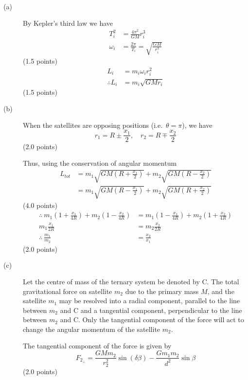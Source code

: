 \begin{description}
\item[(a)] By Kepler's third law we have
  \begin{align*}
    T_i^2 &= \frac{4\pi^2}{GM}r_i^3 \\
    \omega_i &= \frac{2\pi}{T_i} = \sqrt{\frac{GM}{r_i^3}}
  \end{align*}
  \hfill(1.5 points)
  \begin{align*}
    L_i &= m_i\omega_i r_i^2 \\
    \therefore L_i &= m_i\sqrt{GMr_i}
  \end{align*}
  \hfill(1.5 points)

\item[(b)] When the satellites are opposing positions (i.e.\ $\theta = \pi$),
  we have %
  \[
    r_1 = R \pm \frac{x_1}{2}, \quad r_2 = R \mp \frac{x_2}{2}
  \]
  \hfill(2.0 points)

  Thus, using the conservation of angular momentum
  \begin{align*}
    L_{tot} &= m_1\sqrt{GM\left(R + \frac{x_1}{2}\right)}
             + m_2\sqrt{GM\left(R - \frac{x_2}{2}\right)} \\
            &= m_1\sqrt{GM\left(R - \frac{x_1}{2}\right)}
             + m_2\sqrt{GM\left(R + \frac{x_2}{2}\right)}
  \end{align*}
  \hfill(4.0 points)
  \begin{align*}
    \therefore\ m_1\left(1 + \frac{x_1}{4R}\right)
      + m_2\left(1 - \frac{x_2}{4R}\right)
      &= m_1\left(1 - \frac{x_1}{4R}\right)
      + m_2\left(1 + \frac{x_2}{4R}\right) \\
    m_1\frac{x_1}{2R} &= m_2\frac{x_2}{2R} \\
    \therefore\ \frac{m_1}{m_2} &= \frac{x_2}{x_1}
  \end{align*}
  \hfill(2.0 points)

\item[(c)] Let the centre of mass of the ternary system be denoted by C. The
  total gravitational force on satellite $m_2$ due to the primary mass $M$,
  and the satellite $m_1$ may be resolved into a radial component, parallel to
  the line between $m_2$ and C and a tangential component, perpendicular to
  the line between $m_2$ and C. Only the tangential component of the force
  will act to change the angular momentum of the satellite $m_2$.

  The tangential component of the force is given by
  \[
    F_{2_\perp} = \frac{GMm_2}{r_2^2}\sin(\delta\beta)
      - \frac{Gm_1m_2}{d^2}\sin\beta
  \]
  \hfill(2.0 points)


\end{description}
